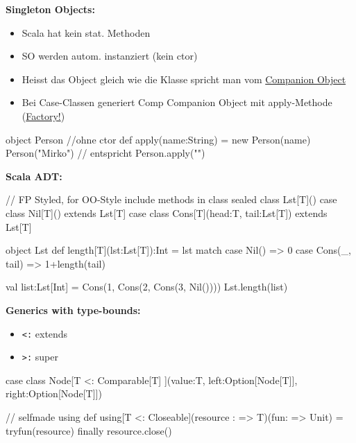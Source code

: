 \begin{breakbox}
\textbf{Singleton Objects:}\\
\begin{itemize}
	\item Scala hat kein stat. Methoden
	\item SO werden autom. instanziert (kein ctor)
	\item Heisst das Object gleich wie die Klasse spricht man vom \underline{Companion Object}
	\item Bei Case-Classen generiert Comp Companion Object mit apply-Methode (\underline{Factory!})
\end{itemize}
\begin{scalacode}
object Person { //ohne ctor
	def apply(name:String) = new Person(name)
}
Person("Mirko") // entspricht Person.apply("")
\end{scalacode}
\end{breakbox}

\begin{breakbox}
\textbf{Scala ADT:}\\
\begin{scalacode}
// FP Styled, for OO-Style include methods in class
sealed class Lst[T]()
case class Nil[T]() extends Lst[T]
case class Cons[T](head:T, tail:Lst[T]) extends Lst[T]

object Lst {
  def length[T](lst:Lst[T]):Int = {
    lst match {
      case Nil() => 0
      case Cons(_, tail) => 1+length(tail)
    }
  }
}

val list:Lst[Int] = Cons(1, Cons(2, Cons(3, Nil())))
Lst.length(list)
\end{scalacode}
\end{breakbox}

\begin{breakbox}
\textbf{Generics with type-bounds:}
\begin{itemize}
	\item \texttt{<:} extends  
	\item \texttt{>:} super 
\end{itemize}
\begin{scalacode}
case class Node[T <: Comparable[T] ](value:T, 
	left:Option[Node[T]], right:Option[Node[T]])

// selfmade using
def using[T <: Closeable](resource : => T)(fun: => Unit) = {
	try{fun(resource)} finally {resource.close()}
}
\end{scalacode}
\end{breakbox}

